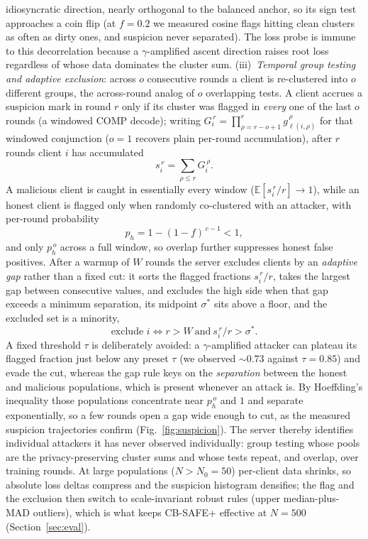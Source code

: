 \documentclass[lettersize,journal]{IEEEtran}
\begin{document}
idiosyncratic direction, nearly orthogonal to the balanced anchor, so its sign test
approaches a coin flip (at $f{=}0.2$ we measured cosine flags hitting clean clusters
as often as dirty ones, and suspicion never separated). The loss probe is immune to
this decorrelation because a $\gamma$-amplified ascent direction raises root loss
regardless of whose data dominates the cluster sum. (iii)~\emph{Temporal group
testing and adaptive exclusion}: across $o$ consecutive rounds a client is
re-clustered into $o$ different groups, the across-round analog of $o$ overlapping
tests. A client accrues a suspicion mark in round $r$ only if its cluster was flagged
in \emph{every} one of the last $o$ rounds (a windowed COMP decode); writing
$G_i^{\,r}=\prod_{\rho=r-o+1}^{r} g_{\ell(i,\rho)}^{\,\rho}$ for that windowed
conjunction ($o{=}1$ recovers plain per-round accumulation), after $r$ rounds client
$i$ has accumulated
\begin{equation}\label{eq:susp}
s_i^{\,r} = \sum_{\rho\le r} G_i^{\,\rho}.
\end{equation}
A malicious client is caught in essentially every window
($\mathbb{E}[s_i^{\,r}/r]\!\to\!1$), while an honest client is flagged only when
randomly co-clustered with an attacker, with per-round probability
\begin{equation}\label{eq:ph}
p_h = 1-(1-f)^{\,c-1} < 1 ,
\end{equation}
and only $p_h^{\,o}$ across a full window, so overlap further suppresses honest false
positives. After a warmup of $W$ rounds the server excludes clients by an
\emph{adaptive gap} rather than a fixed cut: it sorts the flagged fractions
$s_i^{\,r}/r$, takes the largest gap between consecutive values, and excludes the high
side when that gap exceeds a minimum separation, its midpoint $\sigma^{*}$ sits above a
floor, and the excluded set is a minority,
\begin{equation}\label{eq:excl}
\text{exclude } i \iff r>W \ \text{and}\ s_i^{\,r}/r > \sigma^{*} .
\end{equation}
A fixed threshold $\tau$ is deliberately avoided: a $\gamma$-amplified attacker can
plateau its flagged fraction just below any preset $\tau$ (we observed $\sim$0.73
against $\tau{=}0.85$) and evade the cut, whereas the gap rule keys on the
\emph{separation} between the honest and malicious populations, which is present
whenever an attack is. By Hoeffding's inequality those populations concentrate near
$p_h^{\,o}$ and $1$ and separate exponentially, so a few rounds open a gap wide enough
to cut, as the measured suspicion trajectories confirm (Fig.~\ref{fig:suspicion}).
The server thereby identifies individual attackers it has never observed
individually: group testing \cite{dorfman1943,aldridge2019} whose pools are the
privacy-preserving cluster sums and whose tests repeat, and overlap, over training
rounds. At large populations ($N>N_0{=}50$) per-client data shrinks, so absolute loss
deltas compress and the suspicion histogram densifies; the flag and the exclusion then
switch to scale-invariant robust rules (upper median-plus-MAD outliers), which is what
keeps CB-SAFE+ effective at $N{=}500$ (Section~\ref{sec:eval}).
\end{document}
